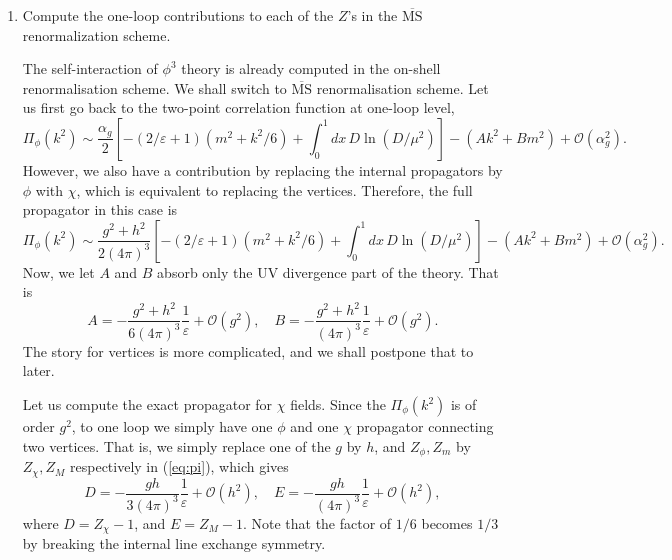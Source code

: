 \begin{enumerate}[label=\alph*)]
    \item Compute the one-loop contributions to each of the $Z$'s in the $\overline{\mathrm{MS}}$ renormalization scheme.
    \begin{solution}
        The self-interaction of $\phi^3$ theory is already computed in the on-shell renormalisation scheme. We shall switch to $\overline{\mathrm{MS}}$ renormalisation scheme. Let us first go back to the two-point correlation function at one-loop level,
        \begin{equation}
            \Pi_\phi(k^2) \sim \frac{\alpha_g}{2}\left[-(2/\varepsilon+1)(m^2+k^2/6)+\int^1_0 dx \,D\ln(D/\mu^2)\right] - (Ak^2 + Bm^2) + \mathcal{O}(\alpha_g^2).
            \label{eq:pi}
        \end{equation}
        However, we also have a contribution by replacing the internal propagators by $\phi$ with $\chi$, which is equivalent to replacing the vertices. Therefore, the full propagator in this case is
        \begin{equation}
            \Pi_\phi(k^2) \sim \frac{g^2 + h^2}{2(4\pi)^3}\left[-(2/\varepsilon+1)(m^2+k^2/6)+\int^1_0 dx \,D\ln(D/\mu^2)\right] - (Ak^2 + Bm^2) + \mathcal{O}(\alpha_g^2).
            \label{eq:pi}
        \end{equation}
        Now, we let $A$ and $B$ absorb only the UV divergence part of the theory. That is
        \begin{equation}
            A = -\frac{g^2 + h^2}{6(4\pi)^3}\frac{1}{\varepsilon} + \mathcal{O}(g^2), \quad B = -\frac{g^2 + h^2}{(4\pi)^3}\frac{1}{\varepsilon} + \mathcal{O}(g^2).
        \end{equation}
        The story for vertices is more complicated, and we shall postpone that to later.

        Let us compute the exact propagator for $\chi$ fields.
        Since the $\Pi_\phi(k^2)$ is of order $g^2$, to one loop we simply have one $\phi$ and one $\chi$ propagator connecting two vertices. That is, we simply replace one of the $g$ by $h$, and $Z_\phi, Z_m$ by $Z_\chi, Z_M$ respectively in (\ref{eq:pi}), which gives
        \begin{equation}
            D = -\frac{gh}{3(4\pi)^3}\frac{1}{\varepsilon} + \mathcal{O}(h^2), \quad E = - \frac{gh}{(4\pi)^3}\frac{1}{\varepsilon} + \mathcal{O}(h^2),
        \end{equation}
        where $D = Z_\chi-1$, and $E = Z_M -1$. Note that the factor of $1/6$ becomes $1/3$ by breaking the internal line exchange symmetry.
        

\end{solution}
\end{enumerate}
